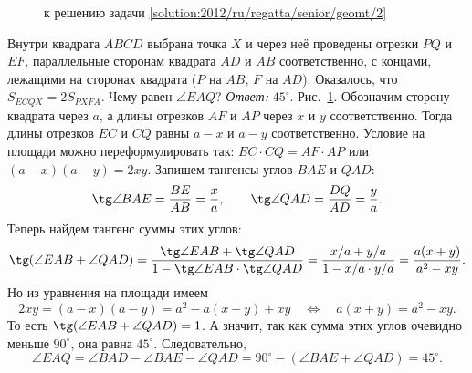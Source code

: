 \ifsolution
\begin{figure}\centering
    \caption{к решению задачи \ref{solution:2012/ru/regatta/senior/geomt/2}}
    \label{fig:solution:2012/ru/regatta/senior/geomt/2}
\end{figure}%
\fi %

\problem
Внутри квадрата $ABCD$ выбрана точка $X$ и через неё проведены отрезки
$PQ$ и $EF$, параллельные сторонам квадрата $AD$ и $AB$ соответственно,
с концами, лежащими на сторонах квадрата ($P$ на $AB$, $F$ на $AD$).
Оказалось, что $S_{ECQX} = 2 S_{PXFA}$.
Чему равен $\angle EAQ$?
\solution
\label{solution:2012/ru/regatta/senior/geomt/2}%
\emph{Ответ:} $45^\circ$.
Рис.~\ref{fig:solution:2012/ru/regatta/senior/geomt/2}.
Обозначим сторону квадрата через $a$, а длины отрезков $AF$ и $AP$ через
$x$ и $y$ соответственно.
Тогда длины отрезков $EC$ и $CQ$ равны $a - x$ и $a - y$ соответственно.
Условие на площади можно переформулировать так:
$EC \cdot CQ = AF \cdot AP$ или $(a - x) (a - y) = 2 x y$.
Запишем тангенсы углов $BAE$ и $QAD$:
\[
    \tg \angle BAE = \dfrac{BE}{AB} = \dfrac{x}{a}
,\qquad
    \tg \angle QAD = \dfrac{DQ}{AD} = \dfrac{y}{a}
.\]
Теперь найдем тангенс суммы этих углов:
\[
    \tg (\angle EAB + \angle QAD)
=
    \dfrac{
        \tg \angle EAB + \tg \angle QAD
    }{
        1 - \tg \angle EAB \cdot \tg \angle QAD
    }
=
    \dfrac{x / a + y / a}{1 - x / a \cdot y / a}
=
    \dfrac{a(x + y)}{a^2 - xy}
.\]
Но из уравнения на площади имеем
\[
    2 x y = (a - x) (a - y) = a^2 - a(x + y) + xy
\quad\Leftrightarrow\quad
    a (x + y) = a^2 - x y
.\]
То есть $\tg (\angle EAB + \angle QAD) = 1$.
А значит, так как сумма этих углов очевидно меньше $90^\circ$,
она равна $45^\circ$.
Следовательно,
\[
    \angle EAQ = \angle BAD - \angle BAE - \angle QAD
=
    90^\circ - (\angle BAE + \angle QAD) = 45^\circ
.\]
\endproblem
